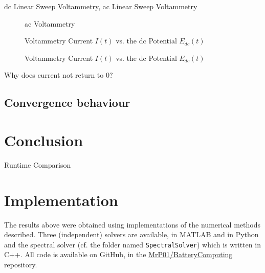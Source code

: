 \documentclass{prettytex/ox/mmsc-special-topic}
\begin{document}
  \gls{dc} Linear Sweep Voltammetry,
  \gls{ac} Linear Sweep Voltammetry

  \begin{figure}[H]
    \centering
    \caption{\gls{ac} Voltammetry}
    \label{fig:ac-voltammetry}
  \end{figure}

  \begin{figure}[H]
    \centering
    \caption{Voltammetry Current $I(t)$ vs. the \gls{dc} Potential $E_{dc}(t)$}
    \label{fig:different-E0s}
  \end{figure}

  \begin{figure}[H]
    \centering
    \caption{Voltammetry Current $I(t)$ vs. the \gls{dc} Potential $E_{dc}(t)$}
    \label{fig:voltammetry-current}
  \end{figure}

  Why does current not return to 0?

  \subsection{Convergence behaviour}

  \section{Conclusion}

  \begin{table}[H]
    \caption{Runtime Comparison}
  \end{table}

  \pagebreak
  \printbibliography
  \printnoidxglossary[type=acronym]

  \appendix
  \section{Implementation}
  The results above were obtained using implementations of the numerical methods described.
  Three (independent) solvers are available, in MATLAB and in Python and the spectral solver (cf. the folder named \texttt{SpectralSolver}) which is written in C++.
  All code is available on GitHub, in the \href{https://github.com/MrP01/BatteryComputing}{MrP01/BatteryComputing} repository.
\end{document}
